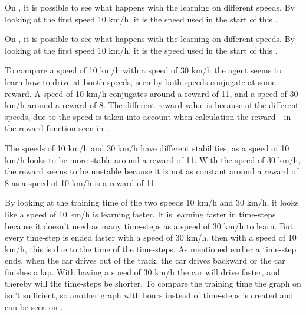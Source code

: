 On , it is possible to see what happens with the learning on different speeds. By looking at the first speed 10 km/h, it is the speed used in the start of this . 

On , it is possible to see what happens with the learning on different speeds. By looking at the first speed 10 km/h, it is the speed used in the start of this . 

To compare a speed of 10 km/h with a speed of 30 km/h the agent seems to learn how to drive at booth speeds, seen by both speeds conjugate at some reward. A speed of 10 km/h conjugates around a reward of 11, and a speed of 30 km/h around a reward of 8. The different reward value is because of the different speeds, due to the speed is taken into account when calculation the reward - in the reward function seen in . 

The speeds of 10 km/h and 30 km/h have different stabilities, as a speed of 10 km/h looks to be more stable around a reward of 11. With the speed of 30 km/h, the reward seems to be unstable because it is not as constant around a reward of 8 as a speed of 10 km/h is a reward of 11.

By looking at the training time of the two speeds 10 km/h and 30 km/h, it looks like a speed of 10 km/h is learning faster. It is learning faster in time-steps because it doesn't need as many time-steps as a speed of 30 km/h to learn. But every time-step is ended faster with a speed of 30 km/h, then with a speed of 10 km/h, this is due to the time of the time-steps. As mentioned earlier a time-step ends, when the car drives out of the track, the car drives backward or the car finishes a lap. With having a speed of 30 km/h the car will drive faster, and thereby will the time-steps be shorter. To compare the training time the graph on  isn't sufficient, so another graph with hours instead of time-steps is created and can be seen on .

